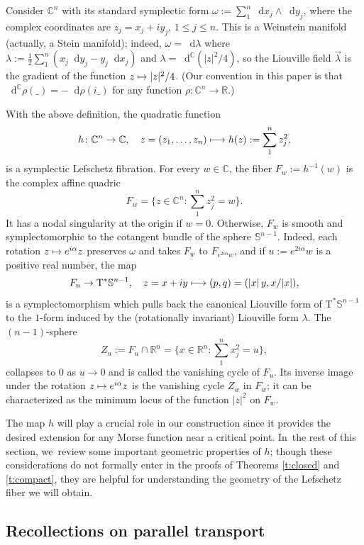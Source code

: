 \documentclass[10pt]{amsart}
\newcommand\mto{\mathchoice{\longmapsto}{\mapsto}{\mapsto}{\mapsto}}
\newcommand{\C}{{\mathbb C}}
\newcommand{\R}{{\mathbb R}}
\newcommand{\bS}{{\mathbb S}}
\newcommand{\etc}{,\ldots,}
\newcommand{\sT}{\mathrm{T}^\ast}
\renewcommand{\d}{\mathop{}\!\mathrm d}
\newcommand{\dc}{\d^{\scriptscriptstyle{\C}}}
\newcommand{\dlambda}{\d\lambda}
\newcommand{\drho}{\d\rho}
\newcommand{\dx}{\d x}
\newcommand{\dy}{\d y}
\newcommand{\de}{\mathrel{:=}}
\newcommand{\with}{\mathrel{:}}
\let\on\colon
\theoremstyle{plain}
\theoremstyle{definition}
\begin{document}
Consider $\C^n$ with its standard symplectic form $\omega \de \sum_1^n
\dx_j \wedge \dy_j$, where the complex coordinates are $z_j = x_j+iy_j$, $1 \le
j \le n$. This is a Weinstein manifold (actually, a Stein manifold); indeed,
$\omega = \dlambda$ where $\lambda \de \frac12 \sum_1^n (x_j\dy_j - y_j\dx_j)$
and $\lambda = \dc(|z|^2/4)$, so the Liouville field $\vec\lambda$ is the
gradient of the function $z \mto |z|^2/4$. (Our convention in this paper is
that $\dc\rho(\_) = - \drho(i\_)$ for any function $\rho \on \C^n \to \R$.)

With the above definition, the quadratic function
\[
h \on \C^n \to \C, \quad
 z = (z_1 \etc z_n) \mto h(z) \de \sum_1^n z_j^2,
\]
is a symplectic Lefschetz fibration. For every $w \in \C$, the fiber $F_w \de
h^{-1}(w)$ is the complex affine quadric
\[
\textstyle
F_w = \bigl\{z \in \C^n \with \sum_1^n z_j^2 = w\bigr\}.
\]
It has a nodal singularity at the origin if $w=0$. Otherwise, $F_w$ is smooth
and symplectomorphic to the cotangent bundle of the sphere $\bS^{n-1}$. Indeed,
each rotation $z \mto e^{i\alpha} z$ preserves $\omega$ and takes $F_w$ to
$F_{e^{2i\alpha} w}$, and if $u \de e^{2i\alpha} w$ is a positive real number,
the map
\[
F_u \to \sT\bS^{n-1}, \quad
 z = x+iy \mto (p,q) = (|x|\,y, x/|x|),
\]
is a symplectomorphism which pulls back the canonical Liouville form of $\sT
\bS^{n-1}$ to the $1$-form induced by the (rotationally invariant) Liouville
form $\lambda$. The $(n-1)$-sphere
\[
\textstyle 
Z_u \de F_u \cap \R^n = \bigl\{x \in \R^n \with
 \sum_1^n x_j^2 = u\bigr\},
\]
collapses to $0$ as $u \to 0$ and is called the vanishing cycle of $F_u$. Its
inverse image under the rotation $z \mto e^{i\alpha}z$ is the vanishing cycle
$Z_w$ in $F_w$; it can be characterized as the minimum locus of the function
$|z|^2$ on $F_w$.

The map $h$ will play a crucial role in our construction since it provides the
desired extension for any Morse function near a critical point. In~the rest of
this section, we~review some important geometric properties of $h$; though these
considerations do not formally enter in the proofs of Theorems \ref{t:closed}
and \ref{t:compact}, they are helpful for understanding the geometry of the
Lefschetz fiber we will obtain.

\subsection{Recollections on parallel transport} \label{ss:locmod1}
\end{document}
